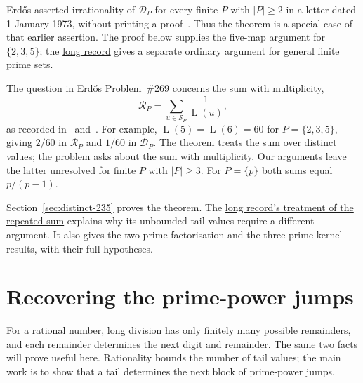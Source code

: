 \documentclass[11pt]{article}
\newcommand{\Lprefix}{\operatorname{L}}
\newcommand{\longrecord}[2]{\href{erdos269-running-lcm-reasoning-surface.pdf\##1}{#2}}
\begin{document}
Erd\H{o}s asserted irrationality of $\mathcal D_P$ for every finite
$P$ with $|P|\ge2$ in a letter dated 1 January 1973, without printing a
proof~\cite[p.~335]{erdos1974letter}. Thus the theorem is a special
case of that earlier assertion. The proof below supplies the five-map
argument for $\{2,3,5\}$; the \longrecord{r3-distinct-proof}{long record}
gives a separate ordinary argument for general finite prime sets.


The question in Erd\H{o}s Problem~\#269 concerns the sum with multiplicity,
\[
 \mathcal R_P=\sum_{u\in\mathcal S_P}\frac1{\Lprefix(u)},
\]
as recorded in~\cite[p.~65]{erdosgraham1980} and~\cite[p.~106]{erdos1988}.
For example, $\Lprefix(5)=\Lprefix(6)=60$ for $P=\{2,3,5\}$, giving
$2/60$ in $\mathcal R_P$ and $1/60$ in $\mathcal D_P$. The theorem treats
the sum over distinct values; the problem asks about the sum with
multiplicity. Our arguments leave the latter unresolved for finite $P$
with $|P|\ge3$. For $P=\{p\}$ both sums equal $p/(p-1)$.

Section~\ref{sec:distinct-235} proves the theorem. The
\longrecord{scope-repeated}{long record's treatment of the repeated sum}
explains why its unbounded tail values require a different argument.
It also gives the two-prime factorisation and the three-prime kernel
results, with their full hypotheses.

\section{Recovering the prime-power jumps}\label{sec:distinct}\label{sec:distinct-235}
For a rational number, long division has only finitely many possible
remainders, and each remainder determines the next digit and remainder.
The same two facts will prove useful here. Rationality bounds the number
of tail values; the main work is to show that a tail determines the next
block of prime-power jumps.
\end{document}
